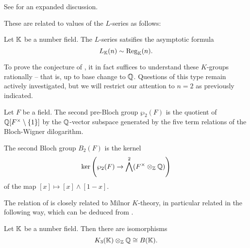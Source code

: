 \begin{remark}
    See \cite[\S IV.1.18.1]{Weibel} for an expanded discussion.
\end{remark}
These are related to values of the $L$-series as follows:
\begin{theorem}\label{thm: Borel regulator and L-function}
    Let $\mathbb{K}$ be a number field. The $L$-series satsifies the asymptotic formula 
    \begin{equation}\label{eqn: L-series asymptotic formula}
        L_{\mathbb{K}}(n)\sim\mathrm{Reg}_{\mathbb{K}}(n).
    \end{equation}
\end{theorem}
To prove the conjecture of , it in fact suffices to understand these $K$-groups rationally -- that is, up to base change to $\mathbb{Q}$. Questions of this type remain actively investigated, but we will restrict our attention to $n=2$ as previously indicated. 
\begin{definition}\label{def: pre-Bloch group}
    Let $F$ be a field. The second pre-Bloch group $\wp_{2}(F)$ is the quotient of $\mathbb{Q}[F^{\times}\setminus\{1\}]$ by the $\mathbb{Q}$-vector subspace generated by the five term relations of the Bloch-Wigner dilogarithm. 
\end{definition}
\begin{definition}\label{def: Bloch group}
    The second Bloch group $B_{2}(F)$ is the kernel 
    $$\ker\left(\wp_{2}(F)\to\bigwedge^{2}(F^{\times}\otimes_{\mathbb{Z}}\mathbb{Q})\right)$$
    of the map $[x]\mapsto[x]\wedge[1-x]$. 
\end{definition}
The relation of  is closely related to Milnor $K$-theory, in particular related in the following way, which can be deduced from \cite[\S 1.5, Thm. 8]{KThyHandbook}.
\begin{theorem}[Bloch]\label{thm: Bloch rational computation of K3}
    Let $\mathbb{K}$ be a number field. Then there are isomorphisms
    $$K_{3}(\mathbb{K})\otimes_{\mathbb{Z}}\mathbb{Q}\cong B(\mathbb{K}).$$
\end{theorem}
